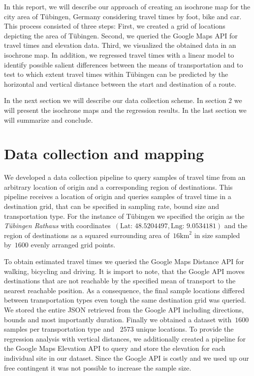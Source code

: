 \documentclass{article}
\begin{document}
In this report, we will describe our approach of creating an isochrone map for the city area of Tübingen, Germany considering travel times by foot, bike and car. This process consisted of three steps: First, we created a grid of locations depicting the area of Tübingen. Second, we queried the Google Maps API for travel times and elevation data. Third, we visualized the obtained data in an isochrone map. In addition, we regressed travel times with a linear model to identify possible salient differences between the means of transportation and to test to which extent travel times within Tübingen can be predicted by the horizontal and vertical distance between the start and destination of a route.

In the next section we will describe our data collection scheme. In section 2 we will present the isochrone maps and the regression results. In the last section we will summarize and conclude. 

\section{Data collection and mapping}
We developed a data collection pipeline to query samples of travel time from an arbitrary location of origin and a corresponding region of destinations. This pipeline receives a location of origin and queries samples of travel time in a destination grid, that can be specified in sampling rate, bound size and transportation type. For the instance of Tübingen we specified the origin as the \textit{Tübingen Rathaus} with coordinates~$(\text{Lat: } 48.5204497, \text{Lng: } 9.0534181)$ and the region of destinations as a squared surrounding area of~$16 \text{km}^2$ in size sampled by~$1600$ evenly arranged grid points. 

To obtain estimated travel times we queried the Google Maps Distance API \cite{googleMapsDirectionsAPI} for walking, bicycling and driving. It is import to note, that the Google API moves destinations that are not reachable by the specified mean of transport to the nearest reachable position. As a consequence, the final sample locations differed between transportation types even tough the same destination grid was queried. We stored the entire JSON retrieved from the Google API including directions, bounds and most importantly duration. Finally we obtained a dataset with~$1600$ samples per transportation type and ~$2573$ unique locations. To provide the regression analysis with vertical distances, we additionally created a pipeline for the Google Maps Elevation API \cite{googleMapsElevationAPI} to query and store the elevation for each individual site in our dataset. Since the Google API is costly and we used up our free contingent it was not possible to increase the sample size.
\end{document}
